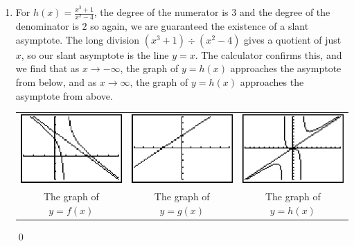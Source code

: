 \begin{ex}
\begin{enumerate}
\item   For $h(x) = \frac{x^3+1}{x^2-4}$, the degree of the numerator is $3$ and the degree of the denominator is $2$ so again, we are guaranteed the existence of a slant asymptote.  The long division $\left(x^3+1 \right) \div \left(x^2-4\right)$ gives a quotient of just $x$, so our slant asymptote is the line $y=x$.  The calculator confirms this, and we find that as $x \rightarrow -\infty$, the graph of $y=h(x)$ approaches the asymptote from below, and as $x \rightarrow \infty$, the graph of $y=h(x)$ approaches the asymptote from above. 

\begin{center}

\begin{tabular}{ccc}

\includegraphics[width=1.75in]{./RationalsGraphics/SAEX01.jpg}  & \includegraphics[width=1.75in]{./RationalsGraphics/SAEX02.jpg} & \includegraphics[width=1.75in]{./RationalsGraphics/SAEX03.jpg} \\

The graph of $y=f(x)$  & The graph of $y=g(x)$ & The graph of $y=h(x)$ \\


\end{tabular}
\end{center} 


\qed

\end{enumerate}

\end{ex}



